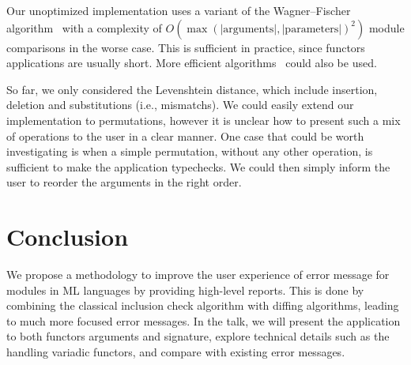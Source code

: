 \documentclass[a4paper,11pt]{scrartcl}
\begin{document}
Our unoptimized implementation uses a variant of the
Wagner–Fischer algorithm~\cite{DBLP:journals/jacm/WagnerF74} with a complexity of
$O(\max(\mathrm{|arguments|,|parameters|})^2)$ module comparisons in the worse case.
This is sufficient in practice, since functors applications are usually short.
More efficient algorithms~\cite{DBLP:journals/siamcomp/LandauMS98} could also be
used.

So far, we only considered the Levenshtein distance, which include
insertion, deletion and substitutions (i.e., mismatchs). We could easily extend
our implementation to permutations, however it is unclear how to present
such a mix of operations to the user in a clear manner.
One case that could be worth investigating is when a simple permutation,
without any other operation,
is sufficient to make the application typechecks. We could then simply
inform the user to reorder the arguments in the right order.



\section{Conclusion}

We propose a methodology to improve the user experience of error message for modules in ML languages by providing high-level reports.
This is done by combining the classical
inclusion check algorithm with diffing algorithms, leading to much more
focused error messages.
In the talk, we will present the application to both functors arguments and
signature, explore technical details such as the handling variadic functors,
and compare with existing error messages.
\end{document}
